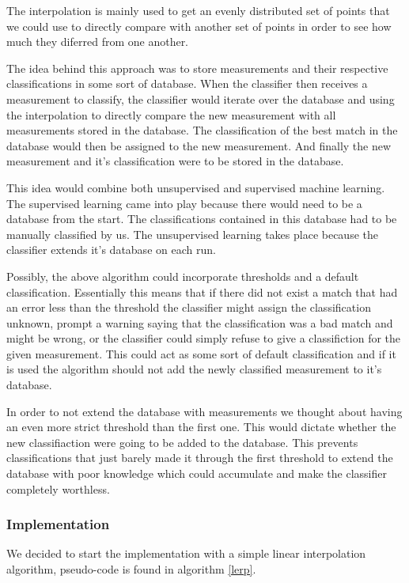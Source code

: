 \documentclass[a4paper, 10pt, conference]{ieeeconf}      %
\begin{document}
The interpolation is mainly used to get an evenly distributed set of points that we could use to directly compare with another set of points in order to see how much they diferred from one another.

The idea behind this approach was to store measurements and their respective classifications in some sort of database. When the classifier then receives a measurement to classify, the classifier would iterate over the database and using the interpolation to directly compare the new measurement with all measurements stored in the database. The classification of the best match in the database would then be assigned to the new measurement. And finally the new measurement and it's classification were to be stored in the database.

This idea would combine both unsupervised and supervised machine learning. The supervised learning came into play because there would need to be a database from the start. The classifications contained in this database had to be manually classified by us. The unsupervised learning takes place because the classifier extends it's database on each run.

Possibly, the above algorithm could incorporate thresholds and a default classification. Essentially this means that if there did not exist a match that had an error less than the threshold the classifier might assign the classification unknown, prompt a warning saying that the classification was a bad match and might be wrong, or the classifier could simply refuse to give a classifiction for the given measurement. This could act as some sort of default classification and if it is used the algorithm should not add the newly classified measurement to it's database.

In order to not extend the database with measurements we thought about having an even more strict threshold than the first one. This would dictate whether the new classifiaction were going to be added to the database. This prevents classifications that just barely made it through the first threshold to extend the database with poor knowledge which could accumulate and make the classifier completely worthless.

\subsubsection{Implementation}
We decided to start the implementation with a simple linear interpolation algorithm, pseudo-code is found in algorithm \ref{lerp}.
\end{document}
